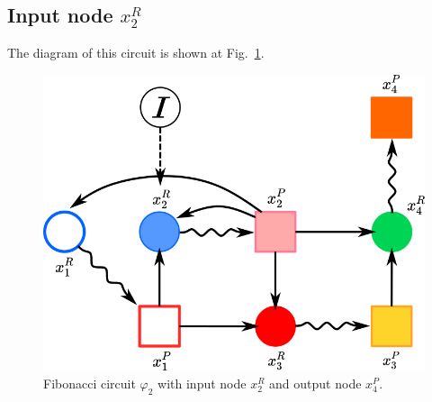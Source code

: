 \subsection{Input node $x_2^R$}

The diagram of this circuit is shown at Fig.~\ref{fig:x2input_fibo}.

\begin{figure}[H]
    \centering
    \includegraphics[scale=0.6]{figs/broken_fibo_1.png}
    \caption{Fibonacci circuit $\varphi_2$ with input node $x_2^R$ and output node $x_4^P$.}
    \label{fig:x2input_fibo}    
\end{figure}

